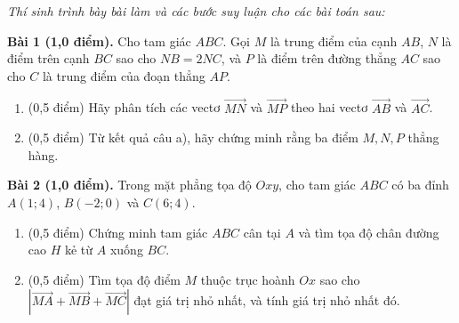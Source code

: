 \documentclass[10pt,a4paper]{article}
\newcommand{\parttitle}[1]{\par\vspace{3.5pt}\needspace{3\baselineskip}{\large\bfseries\color{ink}#1}\par\nopagebreak\vspace{2pt}}
\begin{document}
\vspace{3pt}
\parttitle{PHẦN IV. Tự luận}
\textit{Thí sinh trình bày bài làm và các bước suy luận cho các bài toán sau:}

\vspace{4pt}
\textbf{Bài 1 (1,0 điểm).} Cho tam giác $ABC$. Gọi $M$ là trung điểm của cạnh $AB$, $N$ là điểm trên cạnh $BC$ sao cho $NB = 2NC$, và $P$ là điểm trên đường thẳng $AC$ sao cho $C$ là trung điểm của đoạn thẳng $AP$.
\begin{enumerate}[label=\alph*), leftmargin=0.6cm, itemsep=2pt]
    \item (0,5 điểm) Hãy phân tích các vectơ $\vec{MN}$ và $\vec{MP}$ theo hai vectơ $\vec{AB}$ và $\vec{AC}$.
    \item (0,5 điểm) Từ kết quả câu a), hãy chứng minh rằng ba điểm $M, N, P$ thẳng hàng.
\end{enumerate}

\vspace{6pt}
\textbf{Bài 2 (1,0 điểm).} Trong mặt phẳng tọa độ $Oxy$, cho tam giác $ABC$ có ba đỉnh $A(1; 4)$, $B(-2; 0)$ và $C(6; 4)$.
\begin{enumerate}[label=\alph*), leftmargin=0.6cm, itemsep=2pt]
    \item (0,5 điểm) Chứng minh tam giác $ABC$ cân tại $A$ và tìm tọa độ chân đường cao $H$ kẻ từ $A$ xuống $BC$.
    \item (0,5 điểm) Tìm tọa độ điểm $M$ thuộc trục hoành $Ox$ sao cho $|\vec{MA} + \vec{MB} + \vec{MC}|$ đạt giá trị nhỏ nhất, và tính giá trị nhỏ nhất đó.
\end{enumerate}
\end{document}
